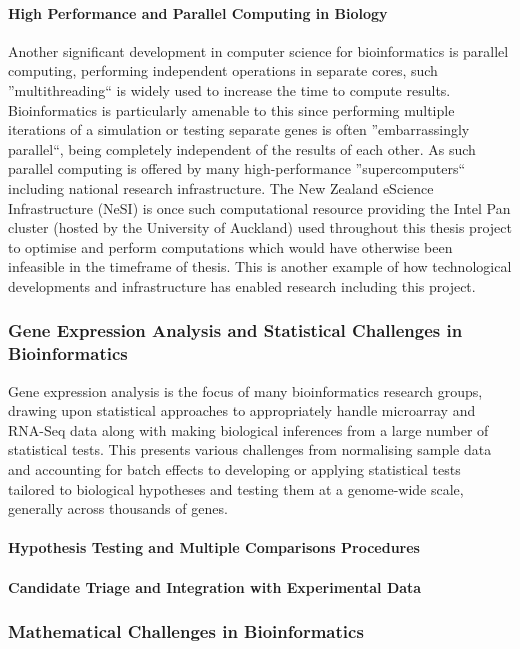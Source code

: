 \paragraph{High Performance and Parallel Computing in Biology}
Another significant development in computer science for bioinformatics is parallel computing, performing independent operations in separate cores, such ''multithreading`` is widely used to increase the time to compute results. Bioinformatics is particularly amenable to this since performing multiple iterations of a simulation or testing separate genes is often ''embarrassingly parallel``, being completely independent of the results of each other. As such parallel computing is offered by many high-performance ''supercomputers`` including national research infrastructure. The New Zealand eScience Infrastructure (NeSI) is once such computational resource providing the Intel Pan cluster (hosted by the University of Auckland) used throughout this thesis project to optimise and perform computations which would have otherwise been infeasible in the timeframe of thesis. This is another example of how technological developments and infrastructure has enabled research including this project.  

\subsubsection{Gene Expression Analysis and Statistical Challenges in Bioinformatics}
Gene expression analysis is the focus of many bioinformatics research groups, drawing upon statistical approaches to appropriately handle microarray and RNA-Seq data along with making biological inferences from a large number of statistical tests. This presents various challenges from normalising sample data and accounting for batch effects to developing or applying statistical tests tailored to biological hypotheses and testing them at a genome-wide scale, generally across thousands of genes. 
\paragraph{Hypothesis Testing and Multiple Comparisons Procedures}
\paragraph{Candidate Triage and Integration with Experimental Data}

\subsubsection{Mathematical Challenges in Bioinformatics}
